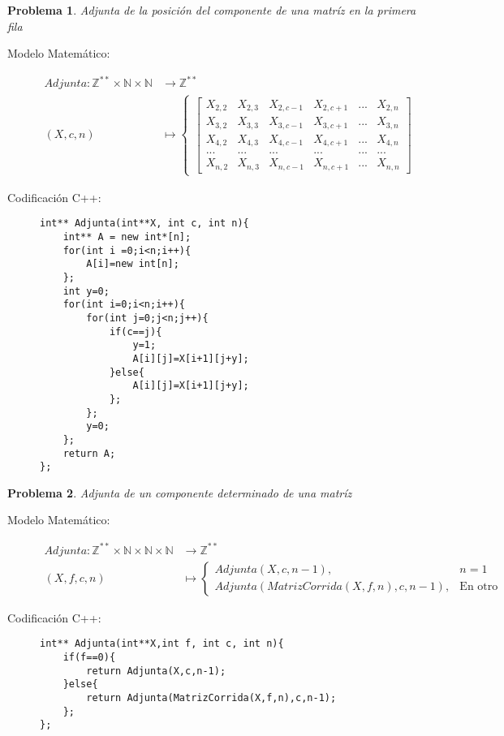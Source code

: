 \documentclass{article}
\theoremstyle{plain}
\theoremstyle{definition}
\newtheorem{problem}{Problema}
\begin{document}
\begin{problem} \emph{Adjunta de la posición del componente de una matríz en la primera fila }\\
\begin{description}
\item[Modelo Matemático:]
\begin{align*}
Adjunta: \mathbb{Z}^{**}\times\mathbb{N}\times\mathbb{N} &\to \mathbb{Z}^{**}\\
(X,c,n) &\mapsto
\begin{cases}
\begin{bmatrix}
X_{2,2} & X_{2,3} & X_{2,c-1} & X_{2,c+1} & ...& X_{2,n} \\
X_{3,2} & X_{3,3} & X_{3,c-1} & X_{3,c+1} & ...& X_{3,n} \\
X_{4,2} & X_{4,3} & X_{4,c-1} & X_{4,c+1} & ... & X_{4,n} \\
... & ... & ... & ...& ... & ...\\
X_{n,2} & X_{n,3} & X_{n,c-1} & X_{n,c+1} & ... & X_{n,n} 
\end{bmatrix}
\end{cases}
\end{align*}
%
\item[Codificación \textsf{C++}:]\hfill
%
\begin{verbatim}
int** Adjunta(int**X, int c, int n){
    int** A = new int*[n];
    for(int i =0;i<n;i++){
        A[i]=new int[n];
    };
    int y=0;
    for(int i=0;i<n;i++){
        for(int j=0;j<n;j++){
            if(c==j){
                y=1;
                A[i][j]=X[i+1][j+y];
            }else{
                A[i][j]=X[i+1][j+y];
            };
        };
        y=0;
    };
    return A;
};

\end{verbatim}
\end{description}
\end{problem}

\begin{problem} \emph{Adjunta de un componente determinado de una matríz }\\
\begin{description}
\item[Modelo Matemático:]
\begin{align*}
Adjunta: \mathbb{Z}^{**}\times\mathbb{N}\times\mathbb{N}\times\mathbb{N} &\to \mathbb{Z}^{**}\\
(X,f,c,n) &\mapsto
\begin{cases}
Adjunta(X,c,n-1),&n=1\\
Adjunta(MatrizCorrida(X,f,n),c,n-1),&\text{En otro caso}
\end{cases}
\end{align*}
%
\item[Codificación \textsf{C++}:]\hfill
%
\begin{verbatim}
int** Adjunta(int**X,int f, int c, int n){
    if(f==0){
        return Adjunta(X,c,n-1);
    }else{
        return Adjunta(MatrizCorrida(X,f,n),c,n-1);
    };
};
\end{verbatim}
\end{description}
\end{problem}
\end{document}
